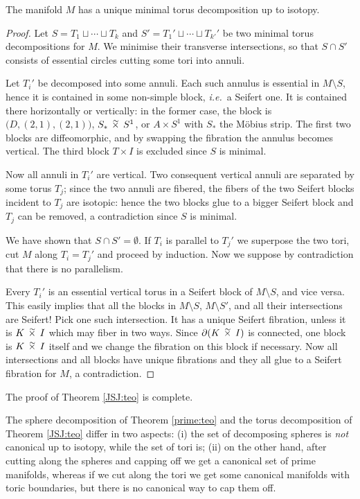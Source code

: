 \begin{prop} \label{minimal:torus:unique:prop}
The manifold $M$ has a unique minimal torus decomposition up to isotopy.
\end{prop}
\begin{proof}
Let $S = T_1\sqcup \cdots \sqcup T_k$ and $S' = T_1' \sqcup \cdots \sqcup T_{k'}'$ be two minimal torus decompositions for $M$. We minimise their transverse intersections, so that $S\cap S'$ consists of essential circles cutting some tori into annuli. 

Let $T_i'$ be decomposed into some annuli. 
Each such annulus is essential in $M\setminus S$, hence it is contained in some non-simple block, \emph{i.e.}~a Seifert one. It is contained there horizontally or vertically: in the former case, the block is $\big(D, (2,1), (2,1) \big)$, $S_*\timtil S^1$, or $A\times S^1$ with $S_*$ the M\"obius strip. The first two blocks are diffeomorphic, and by swapping the fibration the annulus becomes vertical. The third block $T\times I$ is excluded since $S$ is minimal.

Now all annuli in $T_i'$ are vertical. Two consequent vertical annuli are separated by some torus $T_j$; since the two annuli are fibered, the fibers of the two Seifert blocks incident to $T_j$ are isotopic: hence the two blocks glue to a bigger Seifert block and $T_j$ can be removed, a contradiction since $S$ is minimal.

We have shown that $S\cap S' = \emptyset$. If $T_i$ is parallel to $T_j'$ we superpose the two tori, cut $M$ along $T_i=T_j'$ and proceed by induction. Now we suppose by contradiction that there is no parallelism.

Every $T_i'$ is an essential vertical torus in a Seifert block of $M\setminus S$, and vice versa. This easily implies that all the blocks in $M\setminus S$, $M\setminus S'$, and all their intersections are Seifert! Pick one such intersection. It has a unique Seifert fibration, unless it is $K\timtil I$ which may fiber in two ways. Since $\partial (K\timtil I)$ is connected, one block is $K\timtil I$ itself and we change the fibration on this block if necessary. Now all intersections and all blocks have unique fibrations and they all glue to a Seifert fibration for $M$, a contradiction.
\end{proof}

The proof of Theorem \ref{JSJ:teo} is complete.

\begin{oss}
The sphere decomposition of Theorem \ref{prime:teo} and the torus decomposition of Theorem \ref{JSJ:teo} differ in two aspects: (i) the set of decomposing spheres is \emph{not} canonical up to isotopy, while the set of tori is; (ii) on the other hand, after cutting along the spheres and capping off we get a canonical set of prime manifolds, whereas if we cut along the tori we get some canonical manifolds with toric boundaries, but there is no canonical way to cap them off. 
\end{oss}

